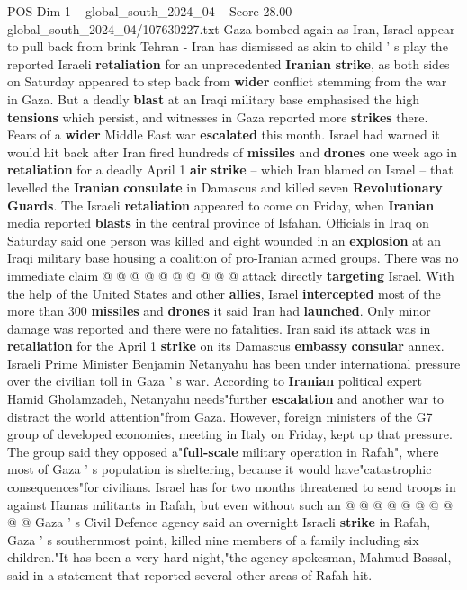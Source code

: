 \begin{textsample}{POS Dim 1 – global\_south\_2024\_04 – Score 28.00 – global\_south\_2024\_04/107630227.txt}  \label{ex:f1_pos_045}
Gaza bombed again as Iran, Israel appear to pull back from brink Tehran - Iran has dismissed as akin to child ' s play the reported Israeli \textbf{retaliation} for an unprecedented \textbf{Iranian} \textbf{strike}, as both sides on Saturday appeared to step back from \textbf{wider} conflict stemming from the war in Gaza.
But a deadly \textbf{blast} at an Iraqi military base emphasised the high \textbf{tensions} which persist, and witnesses in Gaza reported more \textbf{strikes} there.
Fears of a \textbf{wider} Middle East war \textbf{escalated} this month.
Israel had warned it would hit back after Iran fired hundreds of \textbf{missiles} and \textbf{drones} one week ago in \textbf{retaliation} for a deadly April 1 \textbf{air} \textbf{strike} -- which Iran blamed on Israel -- that levelled the \textbf{Iranian} \textbf{consulate} in Damascus and killed seven \textbf{Revolutionary} \textbf{Guards}.
The Israeli \textbf{retaliation} appeared to come on Friday, when \textbf{Iranian} media reported \textbf{blasts} in the central province of Isfahan.
Officials in Iraq on Saturday said one person was killed and eight wounded in an \textbf{explosion} at an Iraqi military base housing a coalition of pro-Iranian armed groups.
There was no immediate claim @ @ @ @ @ @ @ @ @ @ attack directly \textbf{targeting} Israel.
With the help of the United States and other \textbf{allies}, Israel \textbf{intercepted} most of the more than 300 \textbf{missiles} and \textbf{drones} it said Iran had \textbf{launched}.
Only minor damage was reported and there were no fatalities.
Iran said its attack was in \textbf{retaliation} for the April 1 \textbf{strike} on its Damascus \textbf{embassy} \textbf{consular} annex.
Israeli Prime Minister Benjamin Netanyahu has been under international pressure over the civilian toll in Gaza ' s war.
According to \textbf{Iranian} political expert Hamid Gholamzadeh, Netanyahu needs"further \textbf{escalation} and another war to distract the world attention"from Gaza.
However, foreign ministers of the G7 group of developed economies, meeting in Italy on Friday, kept up that pressure.
The group said they opposed a"\textbf{full-scale} military operation in Rafah", where most of Gaza ' s population is sheltering, because it would have"catastrophic consequences"for civilians.
Israel has for two months threatened to send troops in against Hamas militants in Rafah, but even without such an @ @ @ @ @ @ @ @ @ @ Gaza ' s Civil Defence agency said an overnight Israeli \textbf{strike} in Rafah, Gaza ' s southernmost point, killed nine members of a family including six children."It has been a very hard night,"the agency spokesman, Mahmud Bassal, said in a statement that reported several other areas of Rafah hit.

\end{textsample}
